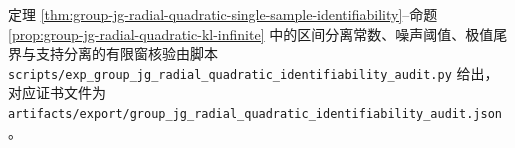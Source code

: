 \begin{remark}[可复现核验脚本]\label{rem:group-jg-radial-quadratic-identifiability-audit-script}
定理 \ref{thm:group-jg-radial-quadratic-single-sample-identifiability}--命题 \ref{prop:group-jg-radial-quadratic-kl-infinite}
中的区间分离常数、噪声阈值、极值尾界与支持分离的有限窗核验由脚本
\texttt{scripts/exp\_group\_jg\_radial\_quadratic\_identifiability\_audit.py}
给出，对应证书文件为
\texttt{artifacts/export/group\_jg\_radial\_quadratic\_identifiability\_audit.json}。
\end{remark}

